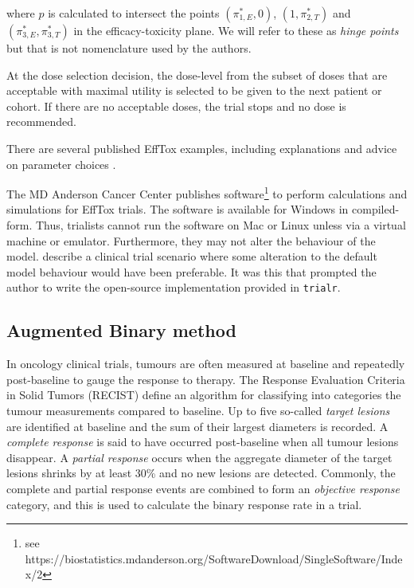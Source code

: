 \documentclass[article]{jss}
\begin{document}
where \(p\) is calculated to intersect the points \((\pi_{1,E}^*, 0)\),
\((1, \pi_{2,T}^*)\) and \((\pi_{3,E}^*, \pi_{3,T}^*)\) in the
efficacy-toxicity plane. We will refer to these as \emph{hinge points}
but that is not nomenclature used by the authors.

At the dose selection decision, the dose-level from the subset of doses
that are acceptable with maximal utility is selected to be given to the
next patient or cohort. If there are no acceptable doses, the trial
stops and no dose is recommended.

There are several published EffTox examples, including explanations and
advice on parameter choices
\citep{Thall2004, Thall2006, Thall2014, Brock2017a}.

The MD Anderson Cancer Center publishes
software\footnote{see https://biostatistics.mdanderson.org/SoftwareDownload/SingleSoftware/Index/2}
to perform calculations and simulations for EffTox trials. The software
is available for Windows in compiled-form. Thus, trialists cannot run
the software on Mac or Linux unless via a virtual machine or emulator.
Furthermore, they may not alter the behaviour of the model.
\citet{Brock2017a} describe a clinical trial scenario where some
alteration to the default model behaviour would have been preferable. It
was this that prompted the author to write the open-source
implementation provided in \texttt{trialr}.

\hypertarget{augmented-binary-method}{%
\subsection{Augmented Binary method}\label{augmented-binary-method}}

In oncology clinical trials, tumours are often measured at baseline and
repeatedly post-baseline to gauge the response to therapy. The Response
Evaluation Criteria in Solid Tumors (RECIST)\citep{Eisenhauer2009}
define an algorithm for classifying into categories the tumour
measurements compared to baseline. Up to five so-called
\textit{target lesions} are identified at baseline and the sum of their
largest diameters is recorded. A \textit{complete response} is said to
have occurred post-baseline when all tumour lesions disappear. A
\textit{partial response} occurs when the aggregate diameter of the
target lesions shrinks by at least 30\% and no new lesions are detected.
Commonly, the complete and partial response events are combined to form
an \textit{objective response} category, and this is used to calculate
the binary response rate in a trial.
\end{document}
